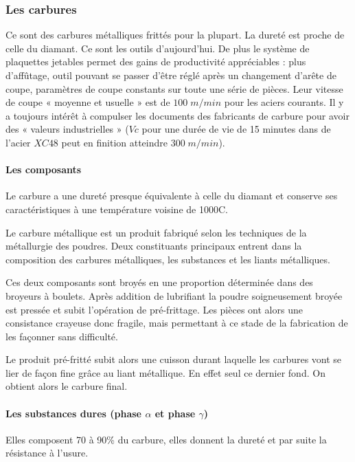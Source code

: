 \documentclass[11pt,oneside]{article}
\begin{document}
\subsubsection{Les carbures}
Ce sont des carbures métalliques frittés pour la plupart. La dureté est proche de celle du diamant. Ce sont les outils d'aujourd'hui. De plus le système de plaquettes jetables permet des gains de productivité appréciables : plus d'affûtage, outil pouvant se passer d'être réglé après un changement d'arête de coupe, paramètres de coupe constants sur toute une série de pièces. Leur vitesse de coupe « moyenne et usuelle » est de $100\; m/min$ pour les aciers courants. Il y a toujours intérêt à compulser les documents des fabricants de carbure pour avoir des « valeurs industrielles » ($Vc$ pour une durée de vie de 15 minutes dans de l'acier $XC48$ peut en finition atteindre $300\; m/min$).

\paragraph{Les composants}
Le carbure a une dureté presque équivalente à celle du diamant et conserve ses caractéristiques à une température voisine de 1000\degre C.
	
Le carbure métallique est un produit fabriqué selon les techniques de la métallurgie des poudres. Deux constituants principaux entrent dans la composition des carbures métalliques, les substances et les liants métalliques.

Ces deux composants sont broyés en une proportion déterminée dans des broyeurs à boulets. Après addition de lubrifiant la poudre soigneusement broyée est pressée et subit l'opération de pré-frittage. Les pièces ont alors une consistance crayeuse donc fragile, mais permettant à ce stade de la fabrication de les façonner sans difficulté. 

Le produit pré-fritté subit alors une cuisson durant laquelle les carbures vont se lier de façon fine grâce au liant métallique. En effet seul ce dernier fond. On obtient alors le carbure final.

\paragraph{Les substances dures (phase $\alpha$ et phase $\gamma$)}
Elles composent 70 à 90\% du carbure, elles donnent la dureté et par suite la résistance à l'usure.
\end{document}

